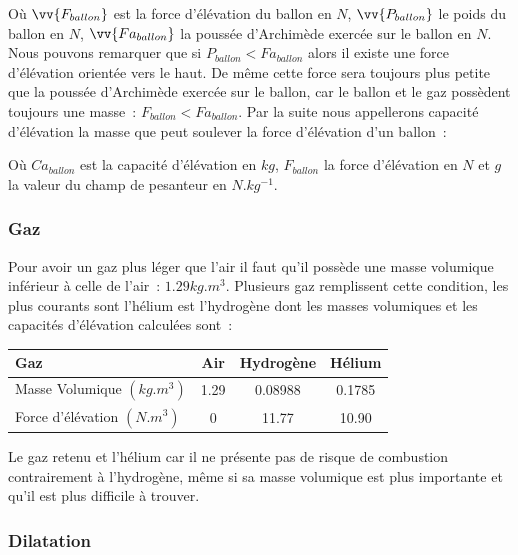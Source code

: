 \documentclass[a4paper,11pt]{article}
\begin{document}
Où $\vv{F_{ballon}}$ est la force d'élévation du ballon en $N$, $\vv{P_{ballon}}$ le poids du ballon en $N$, $\vv{Fa_{ballon}}$ la poussée d'Archimède exercée sur le ballon en $N$. \\

Nous pouvons remarquer que si $P_{ballon} < Fa_{ballon}$ alors il existe une force d'élévation orientée vers le haut. De même cette force sera toujours plus petite que la poussée d'Archimède exercée sur le ballon, car le ballon et le gaz possèdent toujours une masse~: $F_{ballon} < Fa_{ballon}$.
Par la suite nous appellerons capacité d'élévation la masse que peut soulever la force d'élévation d'un ballon~:
\begin{center}
\end{center}

Où $Ca_{ballon}$ est la capacité d'élévation en $kg$, $F_{ballon}$ la force d'élévation en $N$ et $g$ la valeur du champ de pesanteur en $N.kg^{-1}$.

\subsubsection{Gaz}

Pour avoir un gaz plus léger que l'air il faut qu'il possède une masse volumique inférieur à celle de l'air~: $1.29kg.m^3$. Plusieurs gaz remplissent cette condition, les plus courants sont l'hélium est l'hydrogène dont les masses volumiques et les capacités d'élévation calculées sont~:

\begin{center}
	\begin{tabular}{|l|c|c|c|}
		\hline
		Gaz & Air & Hydrogène & Hélium \\
		\hline
		Masse Volumique $(kg.m^3)$ & 1.29 & 0.08988 & 0.1785 \\
		\hline
		Force d'élévation $(N.m^3)$ & 0 & 11.77 & 10.90 \\
		\hline
	\end{tabular}
\end{center}

Le gaz retenu et l'hélium car il ne présente pas de risque de combustion contrairement à l'hydrogène, même si sa masse volumique est plus importante et qu'il est plus difficile à trouver.

\subsubsection{Dilatation}
\end{document}
